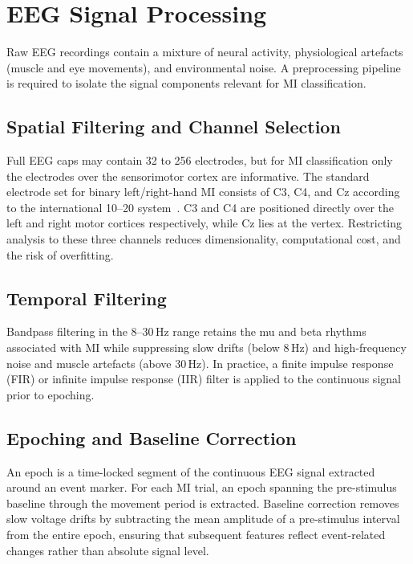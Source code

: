 \documentclass[english, bc, kiv, he, iso690alph, pdf]{fasthesis}
\begin{document}
\section{EEG Signal Processing}

Raw EEG recordings contain a mixture of neural activity, physiological artefacts (muscle and eye movements), and environmental noise. A preprocessing pipeline is required to isolate the signal components relevant for MI classification.

\subsection{Spatial Filtering and Channel Selection}

Full EEG caps may contain 32 to 256 electrodes, but for MI classification only the electrodes over the sensorimotor cortex are informative. The standard electrode set for binary left/right-hand MI consists of C3, C4, and Cz according to the international 10--20 system~\cite{klem1999ten}. C3 and C4 are positioned directly over the left and right motor cortices respectively, while Cz lies at the vertex. Restricting analysis to these three channels reduces dimensionality, computational cost, and the risk of overfitting.

\subsection{Temporal Filtering}

Bandpass filtering in the 8--30\,Hz range retains the mu and beta rhythms associated with MI while suppressing slow drifts (below 8\,Hz) and high-frequency noise and muscle artefacts (above 30\,Hz). In practice, a finite impulse response (FIR) or infinite impulse response (IIR) filter is applied to the continuous signal prior to epoching.

\subsection{Epoching and Baseline Correction}

An epoch is a time-locked segment of the continuous EEG signal extracted around an event marker. For each MI trial, an epoch spanning the pre-stimulus baseline through the movement period is extracted. Baseline correction removes slow voltage drifts by subtracting the mean amplitude of a pre-stimulus interval from the entire epoch, ensuring that subsequent features reflect event-related changes rather than absolute signal level.
\end{document}
